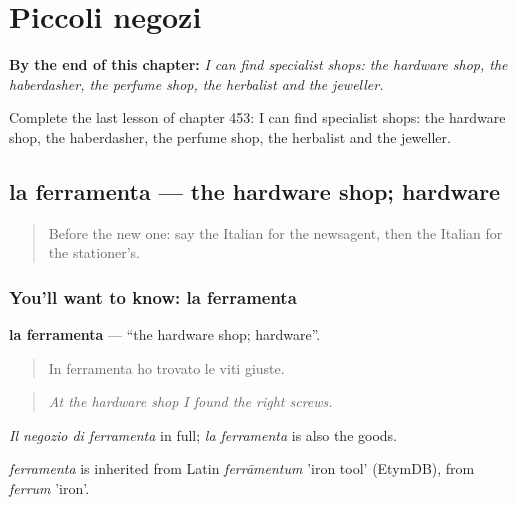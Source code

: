 
\chapter{Piccoli negozi}
\label{ch:it-piccoli-negozi}

\begin{chapteropening}
\textbf{By the end of this chapter:} \emph{I can find specialist shops: the hardware shop, the haberdasher, the perfume shop, the herbalist and the jeweller.}

Complete the last lesson of chapter 453: I can find specialist shops: the hardware shop, the haberdasher, the perfume shop, the herbalist and the jeweller.
\end{chapteropening}

\section[la ferramenta]{la ferramenta — the hardware shop; hardware}

\label{lesson:IT-C453-ferramenta}



\begin{quote}
Before the new one: say the Italian for the newsagent, then the Italian for the stationer's.
\end{quote}

\subsection*{You'll want to know: la ferramenta}
\textbf{la ferramenta} — \textquotedblleft{}the hardware shop; hardware\textquotedblright{}.

\begin{quote}
In ferramenta ho trovato le viti giuste.
\end{quote}

\begin{quote}
\emph{At the hardware shop I found the right screws.}
\end{quote}

\emph{Il negozio di ferramenta} in full; \emph{la ferramenta} is also the goods.

\begin{cousinweb}
\emph{ferramenta} is inherited from Latin \emph{ferrāmentum} 'iron tool' (EtymDB), from \emph{ferrum} 'iron'.
\end{cousinweb}

